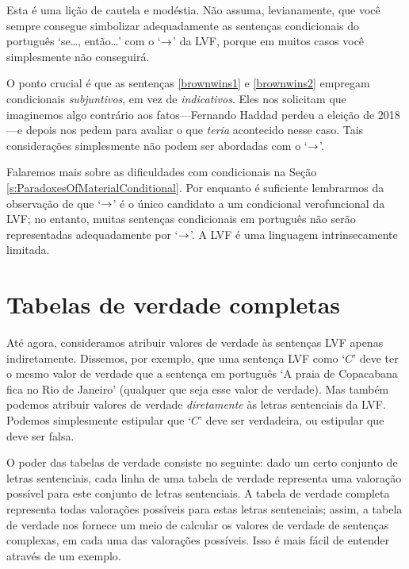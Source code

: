 Esta é uma lição de cautela e modéstia.
Não assuma, levianamente, que você sempre consegue simbolizar adequadamente as sentenças condicionais do português `se\ldots, então\ldots' com o `$\rightarrow$' da LVF, porque em muitos casos você simplesmente não conseguirá.

O ponto crucial é que as sentenças \ref{brownwins1} e \ref{brownwins2} empregam condicionais \emph{subjuntivos}, em vez de \emph{indicativos}.
Eles nos solicitam que imaginemos algo contrário aos fatos---Fernando Haddad perdeu a eleição de 2018---e depois nos pedem para avaliar o que \emph{teria} acontecido nesse caso.
Tais considerações simplesmente não podem ser abordadas com o  `$\rightarrow$'.

Falaremos mais sobre as dificuldades com condicionais na Seção \ref{s:ParadoxesOfMaterialConditional}.
Por enquanto é suficiente lembrarmos da observação de que `$\rightarrow$' é o único candidato a um condicional verofuncional da LVF; no entanto, muitas sentenças condicionais em português não serão representadas adequadamente por `$\rightarrow$'.
A LVF é uma linguagem intrinsecamente limitada.


\chapter{Tabelas de verdade completas}
\label{s:CompleteTruthTables}

Até agora, consideramos atribuir valores de verdade às sentenças LVF apenas indiretamente.
Dissemos, por exemplo, que uma sentença LVF como `$C$' deve ter o mesmo valor de verdade que a sentença em português `A praia de Copacabana fica no Rio de Janeiro' (qualquer que seja esse valor de verdade).
Mas também podemos atribuir valores de verdade \emph{diretamente} às letras sentenciais da LVF.
Podemos simplesmente estipular que `$C$' deve ser verdadeira, ou estipular que deve ser falsa.

O poder das tabelas de verdade consiste no seguinte:
dado um certo conjunto de letras sentenciais, cada linha de uma tabela de verdade representa uma valoração possível para este conjunto de letras sentenciais.
A tabela de verdade completa representa todas valorações possíveis para estas letras sentenciais; assim, a tabela de verdade nos fornece um meio de calcular os valores de verdade de sentenças complexas, em cada uma das valorações possíveis.
Isso é mais fácil de entender através de um exemplo.

